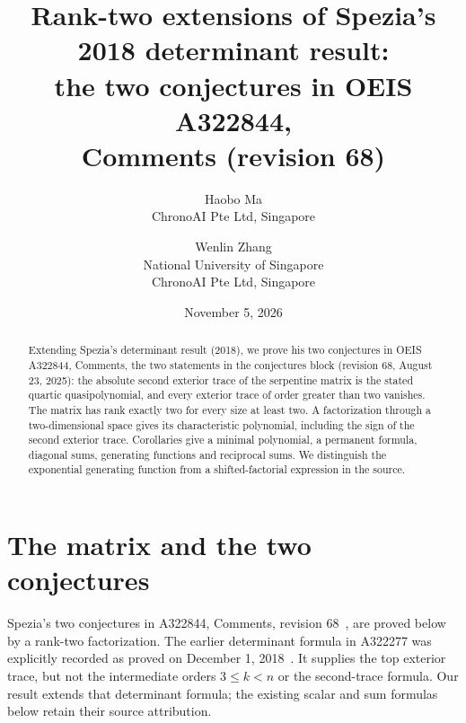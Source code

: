 \documentclass[11pt]{article}
\title{Rank-two extensions of Spezia's 2018 determinant result:\\
the two conjectures in OEIS A322844,\\
Comments (revision 68)}
\author{Haobo Ma\\\small ChronoAI Pte Ltd, Singapore
\and Wenlin Zhang\\\small National University of Singapore\\
\small ChronoAI Pte Ltd, Singapore}
\date{November 5, 2026}
\begin{document}
\maketitle
\begin{abstract}
Extending Spezia's determinant result (2018), we prove his two conjectures
in OEIS A322844, Comments, the two statements in the conjectures block
(revision 68, August 23, 2025): the absolute second exterior trace of
the serpentine matrix is the stated quartic quasipolynomial, and every
exterior trace of order greater than two vanishes.
The matrix has rank exactly two for every size at least two.
A factorization through a two-dimensional space gives its characteristic
polynomial, including the sign of the second exterior trace.
Corollaries give a minimal polynomial, a permanent formula, diagonal sums,
generating functions and reciprocal sums. We distinguish the exponential
generating function from a shifted-factorial expression in the source.
\end{abstract}

\section{The matrix and the two conjectures}
Spezia's two conjectures in A322844, Comments, revision 68~\cite{s322844},
are proved below by a rank-two factorization. The earlier determinant
formula in A322277 was explicitly recorded as proved on December 1,
2018~\cite{s322277}. It supplies the top exterior trace, but not the
intermediate orders $3\leq k<n$ or the second-trace formula. Our result
extends that determinant formula; the existing scalar and sum formulas
below retain their source attribution.
\end{document}
